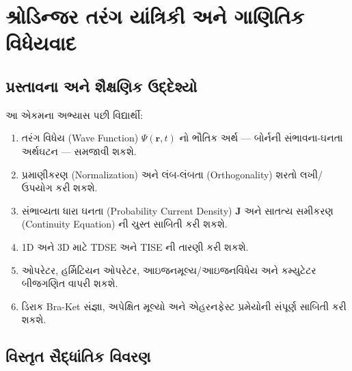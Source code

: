 \chapter[એકમ 3 : શ્રોડિન્જર યાંત્રિકી અને વિધેયવાદ]{શ્રોડિન્જર તરંગ યાંત્રિકી અને ગાણિતિક વિધેયવાદ }

\section{પ્રસ્તાવના અને શૈક્ષણિક ઉદ્દેશ્યો}
\begin{uddeshyo}
આ એકમના અભ્યાસ પછી વિદ્યાર્થી:
\begin{enumerate}[label=\textbf{(\arabic*)}]
  \item તરંગ વિધેય (Wave Function) $\Psi(\mathbf{r},t)$ નો ભૌતિક અર્થ — બોર્નની સંભાવના-ઘનતા અર્થઘટન — સમજાવી શકશે.
  \item પ્રમાણીકરણ (Normalization) અને લંબ-લંબતા (Orthogonality) શરતો લખી/ઉપયોગ કરી શકશે.
  \item સંભાવ્યતા ધારા ઘનતા (Probability Current Density) $\mathbf{J}$ અને સાતત્ય સમીકરણ (Continuity Equation) ની ચુસ્ત સાબિતી કરી શકશે.
  \item 1D અને 3D માટે TDSE અને TISE ની તારણી કરી શકશે.
  \item ઓપરેટર, હર્મિટિયન ઓપરેટર, આઇજનમૂલ્ય/આઇજનવિધેય અને કમ્યુટેટર બીજગણિત વાપરી શકશે.
  \item ડિરાક Bra-Ket સંજ્ઞા, અપેક્ષિત મૂલ્યો અને એહરનફેસ્ટ પ્રમેયોની સંપૂર્ણ સાબિતી કરી શકશે.
\end{enumerate}
\end{uddeshyo}

\section{વિસ્તૃત સૈદ્ધાંતિક વિવરણ}

